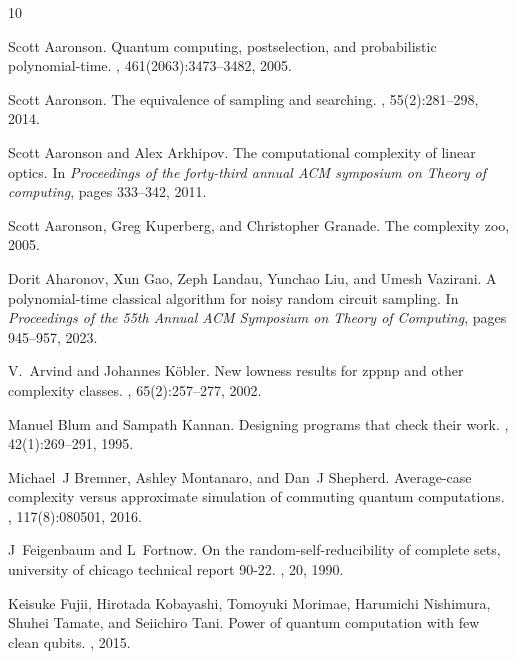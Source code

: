 \documentclass[10pt,a4paper]{article}
\begin{document}
\begin{thebibliography}{10}

Scott Aaronson.
\newblock Quantum computing, postselection, and probabilistic polynomial-time.
, 461(2063):3473--3482, 2005.

Scott Aaronson.
\newblock The equivalence of sampling and searching.
, 55(2):281--298, 2014.

Scott Aaronson and Alex Arkhipov.
\newblock The computational complexity of linear optics.
\newblock In {\em Proceedings of the forty-third annual ACM symposium on Theory of computing}, pages 333--342, 2011.

Scott Aaronson, Greg Kuperberg, and Christopher Granade.
\newblock The complexity zoo, 2005.

Dorit Aharonov, Xun Gao, Zeph Landau, Yunchao Liu, and Umesh Vazirani.
\newblock A polynomial-time classical algorithm for noisy random circuit sampling.
\newblock In {\em Proceedings of the 55th Annual ACM Symposium on Theory of Computing}, pages 945--957, 2023.

V.~Arvind and Johannes Köbler.
\newblock New lowness results for zppnp and other complexity classes.
, 65(2):257--277, 2002.

Manuel Blum and Sampath Kannan.
\newblock Designing programs that check their work.
, 42(1):269--291, 1995.

Michael~J Bremner, Ashley Montanaro, and Dan~J Shepherd.
\newblock Average-case complexity versus approximate simulation of commuting quantum computations.
, 117(8):080501, 2016.

J~Feigenbaum and L~Fortnow.
\newblock On the random-self-reducibility of complete sets, university of chicago technical report 90-22.
, 20, 1990.

Keisuke Fujii, Hirotada Kobayashi, Tomoyuki Morimae, Harumichi Nishimura, Shuhei Tamate, and Seiichiro Tani.
\newblock Power of quantum computation with few clean qubits.
, 2015.


\end{thebibliography}
\end{document}
